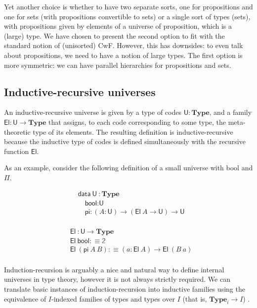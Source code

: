 \documentclass[autoref]{llncs}
\newcommand{\mType}{\mathbf{Type}}
\newcommand{\U}{\textsf{U}}
\newcommand{\El}{\textsf{El}}
\providecommand\mathbbm{\mathbb}
\begin{document}
Yet another choice is whether to have two separate sorts, one for propositions
and one for sets (with propositions convertible to sets) or a single sort of
types (sets), with propositions given by elements of a universe of proposition,
which is a (large) type. We have chosen to present the second option to fit with
the standard notion of (unisorted) CwF. However, this has downsides: to even
talk about propositions, we need to have a notion of large types. The first
option is more symmetric: we can have parallel hierarchies for propositions and
sets.

\subsection{Inductive-recursive universes}\label{ir-universes}

An inductive-recursive universe is given by a type of codes $\U : \mType$, and a
family $\El : \U \to \mType$ that assigns, to each code corresponding to some
type, the meta-theoretic type of its elements. The resulting definition is
inductive-recursive because the inductive type of codes is defined
simultaneously with the recursive function $\El$.

As an example, consider the following definition of a small universe with
bool and $\Pi$. \\
\vspace{-0.2em}
\begin{minipage}{0.45\textwidth}
\begin{align*}
  & \textsf{data}\ \U\ : \mType \\
  & \quad \textsf{bool} : \U \\
  & \quad \textsf{pi} : (A : \U) \to (\El\ A \to \U) \to \U \\
\end{align*}
\end{minipage}
\begin{minipage}{0.45\textwidth}
\begin{align*}
  & \El\ : \U \to \mType \\
  & \El\ \textsf{bool} :\equiv \mathbbm{2} \\
  & \El\ (\textsf{pi}\ A\ B) :\equiv (a : \El\ A) \to \El\ (B\ a) \\
\end{align*}
\end{minipage}

Induction-recursion is arguably a nice and natural way to define internal
universes in type theory, however it is not always strictly required.
%
We can translate basic instances of induction-recursion into inductive families
using the equivalence of $I$-indexed families of types and types over $I$
(that is, $\mType_i \to I$) \cite{malatasta13smallir}.
\end{document}
